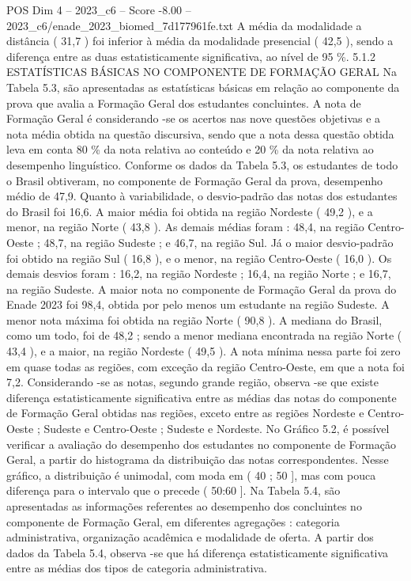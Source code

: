 \begin{textsample}{POS Dim 4 – 2023\_c6 – Score -8.00 – 2023\_c6/enade\_2023\_biomed\_7d177961fe.txt}
A média da modalidade a distância ( 31,7 ) foi inferior à média da modalidade presencial ( 42,5 ), sendo a diferença entre as duas estatisticamente significativa, ao nível de 95 \%. 5.1.2 ESTATÍSTICAS BÁSICAS NO COMPONENTE DE FORMAÇÃO GERAL Na Tabela 5.3, são apresentadas as estatísticas básicas em relação ao componente da prova que avalia a Formação Geral dos estudantes concluintes.
A nota de Formação Geral é considerando -se os acertos nas nove questões objetivas e a nota média obtida na questão discursiva, sendo que a nota dessa questão obtida leva em conta 80 \% da nota relativa ao conteúdo e 20 \% da nota relativa ao desempenho linguístico.
Conforme os dados da Tabela 5.3, os estudantes de todo o Brasil obtiveram, no componente de Formação Geral da prova, desempenho médio de 47,9.
Quanto à variabilidade, o desvio-padrão das notas dos estudantes do Brasil foi 16,6.
A maior média foi obtida na região Nordeste ( 49,2 ), e a menor, na região Norte ( 43,8 ).
As demais médias foram : 48,4, na região Centro-Oeste ; 48,7, na região Sudeste ; e 46,7, na região Sul.
Já o maior desvio-padrão foi obtido na região Sul ( 16,8 ), e o menor, na região Centro-Oeste ( 16,0 ).
Os demais desvios foram : 16,2, na região Nordeste ; 16,4, na região Norte ; e 16,7, na região Sudeste.
A maior nota no componente de Formação Geral da prova do Enade 2023 foi 98,4, obtida por pelo menos um estudante na região Sudeste.
A menor nota máxima foi obtida na região Norte ( 90,8 ).
A mediana do Brasil, como um todo, foi de 48,2 ; sendo a menor mediana encontrada na região Norte ( 43,4 ), e a maior, na região Nordeste ( 49,5 ).
A nota mínima nessa parte foi zero em quase todas as regiões, com exceção da região Centro-Oeste, em que a nota foi 7,2.
Considerando -se as notas, segundo grande região, observa -se que existe diferença estatisticamente significativa entre as médias das notas do componente de Formação Geral obtidas nas regiões, exceto entre as regiões Nordeste e Centro-Oeste ; Sudeste e Centro-Oeste ; Sudeste e Nordeste.
No Gráfico 5.2, é possível verificar a avaliação do desempenho dos estudantes no componente de Formação Geral, a partir do histograma da distribuição das notas correspondentes.
Nesse gráfico, a distribuição é unimodal, com moda em ( 40 ; 50 ], mas com pouca diferença para o intervalo que o precede ( 50:60 ].
Na Tabela 5.4, são apresentadas as informações referentes ao desempenho dos concluintes no componente de Formação Geral, em diferentes agregações : categoria administrativa, organização acadêmica e modalidade de oferta.
A partir dos dados da Tabela 5.4, observa -se que há diferença estatisticamente significativa entre as médias dos tipos de categoria administrativa.

\end{textsample}
